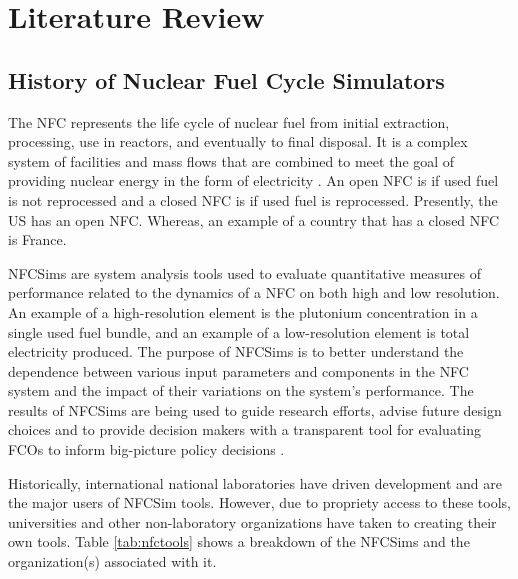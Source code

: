 \chapter{Literature Review}

\section{History of Nuclear Fuel Cycle Simulators}
The \gls{NFC} represents the life cycle of nuclear fuel from initial
extraction, processing, use in reactors, and eventually to 
final disposal.
It is a complex system of facilities and mass flows 
that are combined to meet the goal of providing nuclear energy 
in the 
form of electricity \cite{yacout_modeling_2005}.
An open \gls{NFC} is if used fuel is not reprocessed and a 
closed \gls{NFC} is if used fuel is reprocessed. 
Presently, the \gls{US} has an open \gls{NFC}. 
Whereas, an example of a country that has a 
closed \gls{NFC} is France. 

\glspl{NFCSim} are system analysis tools used to evaluate 
quantitative measures of performance related to the dynamics of 
a \gls{NFC} on both high and low resolution. 
An example of a high-resolution element is the plutonium 
concentration in a single used fuel bundle, and an example 
of a low-resolution element is total electricity produced. 
The purpose of \glspl{NFCSim} is to better understand the 
dependence between various input parameters and components 
in the \gls{NFC} system and the impact of their variations on 
the system's performance. 
The results of \glspl{NFCSim} are being used to guide research 
efforts, advise future design choices and to provide 
decision makers with a transparent tool for evaluating \glspl{FCO} 
to inform big-picture policy decisions \cite{yacout_modeling_2005}.

Historically, international national laboratories have driven 
development and are the major users of \gls{NFCSim} tools. 
However, due to propriety access to these tools, universities and 
other non-laboratory organizations have taken to creating their 
own tools. 
Table \ref{tab:nfctools} shows a breakdown of the \glspl{NFCSim}
and the organization(s) associated with it. 

